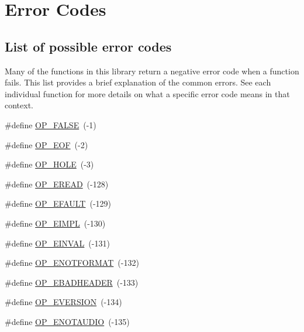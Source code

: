 \hypertarget{group__error__codes}{}\section{Error Codes}
\label{group__error__codes}
\subsection*{List of possible error codes}
\label{_amgrpacecf4314d910b089a039a9e23f42c77}%
Many of the functions in this library return a negative error code when a function fails. This list provides a brief explanation of the common errors. See each individual function for more details on what a specific error code means in that context. \begin{DoxyCompactItemize}
\item 
\#define \hyperlink{group__error__codes_ga4fd28e64a5cbe5e0ba163916199611a5}{O\+P\+\_\+\+F\+A\+L\+SE}~(-\/1)
\item 
\#define \hyperlink{group__error__codes_ga3fdffc8ee880969d99fc862d53c0efd2}{O\+P\+\_\+\+E\+OF}~(-\/2)
\item 
\#define \hyperlink{group__error__codes_ga2ac03d35986d3505305d468dd2138b72}{O\+P\+\_\+\+H\+O\+LE}~(-\/3)
\item 
\#define \hyperlink{group__error__codes_ga3ad48a4f99b1bed72acec552296dfc08}{O\+P\+\_\+\+E\+R\+E\+AD}~(-\/128)
\item 
\#define \hyperlink{group__error__codes_ga2ddb887c0bb55c74ea6be391fabcba59}{O\+P\+\_\+\+E\+F\+A\+U\+LT}~(-\/129)
\item 
\#define \hyperlink{group__error__codes_gaeea27378f826033ca23584d8403665d3}{O\+P\+\_\+\+E\+I\+M\+PL}~(-\/130)
\item 
\#define \hyperlink{group__error__codes_gae0879acafe9cc0ab72462d291fdb6fb6}{O\+P\+\_\+\+E\+I\+N\+V\+AL}~(-\/131)
\item 
\#define \hyperlink{group__error__codes_gafca3ae244d24e10b2851c77379453220}{O\+P\+\_\+\+E\+N\+O\+T\+F\+O\+R\+M\+AT}~(-\/132)
\item 
\#define \hyperlink{group__error__codes_ga534f1b45c8733a2928434e482b38869f}{O\+P\+\_\+\+E\+B\+A\+D\+H\+E\+A\+D\+ER}~(-\/133)
\item 
\#define \hyperlink{group__error__codes_gaa9ae4494f623f3c0609f0b4bd99b8f32}{O\+P\+\_\+\+E\+V\+E\+R\+S\+I\+ON}~(-\/134)
\item 
\#define \hyperlink{group__error__codes_ga3a2a6cb4837030d240f326e17dda3c0e}{O\+P\+\_\+\+E\+N\+O\+T\+A\+U\+D\+IO}~(-\/135)

\end{DoxyCompactItemize}
